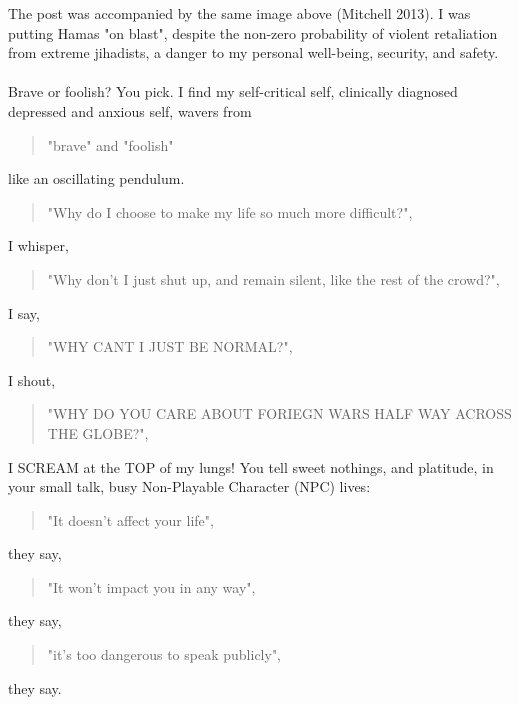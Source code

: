 \documentclass[16pt,openany,oneside]{book}
\begin{document}
The post was accompanied by the same image above (Mitchell 2013). I was putting Hamas 
    "on blast", 
despite the non-zero probability of violent retaliation from extreme jihadists, a danger to my personal well-being, security, and safety. 
\\\\
Brave or foolish? You pick. I find my self-critical self, clinically diagnosed depressed and anxious self, wavers from 
\begin{quote}
    "brave" and "foolish" 
\end{quote}
like an oscillating pendulum. 
\begin{quote}
    "Why do I choose to make my life so much more difficult?", 
\end{quote}  
I whisper,
\begin{quote}
    "Why don't I just shut up, and remain silent, like the rest of the crowd?", 
\end{quote}
I say,
\begin{quote}    
    "WHY CANT I JUST BE NORMAL?", 
\end{quote}
I shout, 
 \begin{quote}   
    "WHY DO YOU CARE ABOUT FORIEGN WARS HALF WAY ACROSS THE GLOBE?", 
\end{quote}
I SCREAM at the TOP of my lungs!
You tell sweet nothings, and platitude, in your small talk, busy Non-Playable Character (NPC) lives:
\begin{quote}
    "It doesn't affect your life", 
\end{quote}    
they say,
\begin{quote}
    "It won't impact you in any way", 
\end{quote}  
they say,
\begin{quote}
    "it's too dangerous to speak publicly", 
\end{quote}    
they say.
\end{document}
